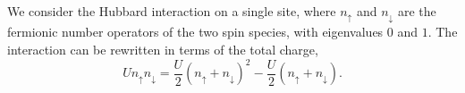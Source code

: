\documentclass{article}
\begin{document}
We consider the Hubbard interaction on a single site, where $n_\uparrow$ and $n_\downarrow$ are the
fermionic number operators of the two spin species, with eigenvalues $0$ and $1$.
The interaction can be rewritten in terms of the total charge,
\begin{equation}
U n_\uparrow n_\downarrow = \frac{U}{2}\left(n_\uparrow + n_\downarrow\right)^2 - \frac{U}{2}\left(n_\uparrow + n_\downarrow\right) .
\label{eq:hub}
\end{equation}
\end{document}
